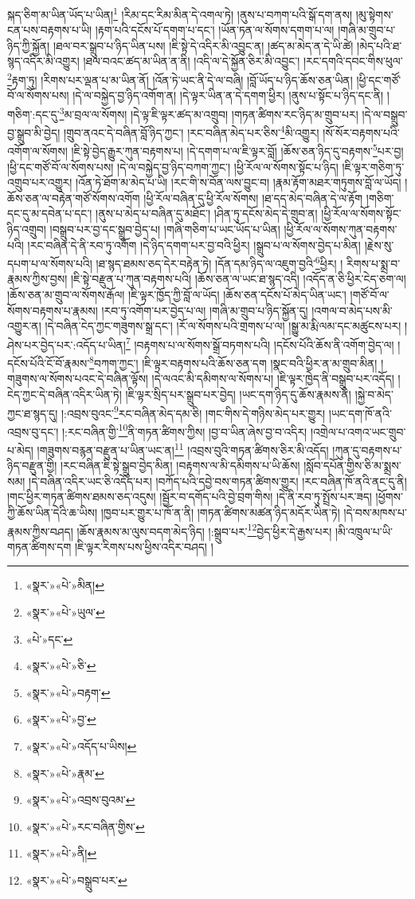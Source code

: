 སྐད་ཅིག་མ་ཡིན་ཡོད་པ་ཡིན།\footnote{«སྣར་»«པེ་»མིན།} །རིམ་དང་རིམ་མིན་དེ་འགལ་ཏེ། །ནུས་པ་བཀག་པའི་སྒོ་དག་ནས། །མུ་སྟེགས་ངན་པས་བརྟགས་པ་ཡི། །རྟག་པའི་དངོས་པོ་དགག་པ་དང་། །ཡོན་ཏན་ལ་སོགས་དགག་པ་ལ། །གཞི་མ་གྲུབ་པ་ཉིད་ཀྱི་སྐྱོན། །ཐལ་བར་སྒྲུབ་པ་ཉིད་ཡིན་པས། །ཇི་སྟེ་དེ་འདིར་མི་འབྱུང་ན། །ཚད་མ་མེད་ན་དེ་ཡི་ཚེ། །མེད་པའི་ཐ་སྙད་འདིར་མི་འགྱུར། །ཐལ་བའང་ཚད་མ་ཡིན་ན་ནི། །འདི་ལ་དེ་སྐྱོན་ཅིར་མི་འབྱུང་། །རང་དགའི་དབང་གིས་ཕུལ་\footnote{«སྣར་»«པེ་»ཡུལ་}རྟག་ཏུ། །རིགས་པར་ལྡན་པ་མ་ཡིན་ནོ། །འོན་ཏེ་ཡང་ནི་དེ་ལ་བཞི། །བློ་ཡོད་པ་ཉིད་ཆོས་ཅན་ཡིན། །ཕྱི་དང་གཙོ་བོ་ལ་སོགས་པས། །དེ་ལ་བསྐྱེད་བྱ་ཉིད་འགོག་ན། །དེ་ལྟར་ཡིན་ན་དེ་དགག་ཕྱིར། །ནུས་པ་སྟོང་པ་ཉིད་དང་ནི། །གཅིག་:དང་དུ་\footnote{«པེ་»དང་}མ་བྲལ་ལ་སོགས། །དེ་ལྟ་ཇི་ལྟར་ཚད་མ་འགྲུབ། །གཏན་ཚིགས་རང་ཉིད་མ་གྲུབ་པར། །དེ་ལ་བསྒྲུབ་བྱ་སྒྲུབ་མི་བྱེད། །གྲུབ་ནའང་དེ་བཞིན་བློ་ཉིད་ཀྱང་། །རང་བཞིན་མེད་པར་ཅིས་\footnote{«སྣར་»«པེ་»ཅི་}མི་འགྱུར། །སོ་སོར་བརྟགས་པའི་འགོག་ལ་སོགས། །ཇི་སྟེ་བྱེད་རྒྱུར་ཀུན་བརྟགས་པ། །དེ་དགག་པ་ལ་ཇི་ལྟར་བློ། །ཆོས་ཅན་ཉིད་དུ་བརྟགས་\footnote{«སྣར་»«པེ་»བརྟག་}པར་བྱ། །ཕྱི་དང་གཙོ་བོ་ལ་སོགས་པས། །དེ་ལ་བསྐྱེད་བྱ་ཉིད་བཀག་ཀྱང་། །ཕྱི་རོལ་ལ་སོགས་སྟོང་པ་ཉིད། །ཇི་ལྟར་གཅིག་ཏུ་འགྲུབ་པར་འགྱུར། །འོན་ཏེ་ཐོག་མ་མེད་པ་ཡི། །རང་གི་ས་བོན་ལས་བྱུང་བ། །རྣམ་རྟོག་མཐར་གཏུགས་བློ་ལ་ཡོད། །ཆོས་ཅན་ལ་བརྟེན་གཙོ་སོགས་འགོག །ཕྱི་རོལ་བཞིན་དུ་ཕྱི་རོལ་སོགས། །ཐ་དད་མེད་བཞིན་དེ་ལ་རྟོག །གཅིག་དང་དུ་མ་དབེན་པ་དང་། །ནུས་པ་མེད་པ་བཞིན་དུ་མཐོང་། །ཤིན་ཏུ་དངོས་མེད་དེ་གྲུབ་ན། །ཕྱི་རོལ་ལ་སོགས་སྟོང་ཉིད་འགྲུབ། །བསྒྲུབ་པར་བྱ་དང་སྒྲུབ་བྱེད་པ། །གཞི་གཅིག་པ་ཡང་ཡོད་པ་ཡིན། །ཕྱི་རོལ་ལ་སོགས་ཀུན་བརྟགས་པའི། །རང་བཞིན་དེ་ནི་རབ་ཏུ་འགོག །དེ་ཉིད་དགག་པར་བྱ་བའི་ཕྱིར། །སྒྲུབ་པ་ལ་སོགས་བྱེད་པ་མིན། །རྗེས་སུ་དཔག་པ་ལ་སོགས་པའི། །ཐ་སྙད་ཐམས་ཅད་དེར་བརྟེན་ཏེ། །དོན་དམ་ཉིད་ལ་འཇུག་བྱའི་\footnote{«སྣར་»«པེ་»བྱ་}ཕྱིར། །
རིགས་པ་སྨྲ་བ་རྣམས་ཀྱིས་བྱས། །ཇི་སྟེ་བརྫུན་པ་ཀུན་བརྟགས་པའི། །ཆོས་ཅན་ལ་ཡང་ཐ་སྙད་འདི། །འདོད་ན་ཅི་ཕྱིར་ངེད་ཅག་ལ། །ཆོས་ཅན་མ་གྲུབ་ལ་སོགས་རྒོལ། །ཇི་ལྟར་ཁྱོད་ཀྱི་བློ་ལ་ཡོད། །ཆོས་ཅན་དངོས་པོ་མེད་ཡིན་ཡང་། །གཙོ་བོ་ལ་སོགས་བརྟགས་པ་རྣམས། །རབ་ཏུ་འགོག་པར་བྱེད་པ་ལ། །གཞི་མ་གྲུབ་པ་ཉིད་སྐྱོན་དུ། །འགལ་བ་མེད་པས་མི་འགྱུར་ན། །དེ་བཞིན་ངེད་ཀྱང་གཟུགས་སྒྲ་དང་། །རོ་ལ་སོགས་པའི་གྲགས་པ་ལ། །སྒྱུ་མ་རྨི་ལམ་དང་མཚུངས་པར། །ཤེས་པར་བྱེད་པར་:འདོད་པ་ཡིན།\footnote{«སྣར་»«པེ་»འདོད་པ་ཡིས།} །བརྟགས་པ་ལ་སོགས་སྒྲོ་བཏགས་པའི། །དངོས་པོའི་ཆོས་ནི་འགོག་བྱེད་ལ། །དངོས་པོའི་ངོ་བོ་རྣམས་\footnote{«སྣར་»«པེ་»རྣམ་}བཀག་ཀྱང་། །ཇི་ལྟར་བརྟགས་པའི་ཆོས་ཅན་དག །སྣང་བའི་ཕྱིར་ན་མ་གྲུབ་མིན། །གཟུགས་ལ་སོགས་པའང་དེ་བཞིན་ལྟོས། །དེ་ལའང་མི་དམིགས་ལ་སོགས་པ། །ཇི་ལྟར་ཁྱེད་ནི་བསྒྲུབ་པར་འདོད། །ངེད་ཀྱང་དེ་བཞིན་འདིར་ཡིན་ཏེ། །ཇི་ལྟར་སྲིད་པར་སྒྲུབ་པར་བྱེད། །ཡང་དག་ཉིད་དུ་ཆོས་རྣམས་ནི། །སྐྱེ་བ་མེད་ཀྱང་ཐ་སྙད་དུ། །:འབྲས་བུའང་\footnote{«སྣར་»«པེ་»འབྲས་བུའམ་}རང་བཞིན་མེད་དམ་ཅི། །གང་གིས་དེ་གཉིས་མེད་པར་གྱུར། །ཡང་དག་ཁོ་ནའི་འབྲས་བུ་དང་། །:རང་བཞིན་གྱི་\footnote{«སྣར་»«པེ་»རང་བཞིན་གྱིས་}ནི་གཏན་ཚིགས་ཀྱིས། །བྱ་བ་ཡིན་ཞེས་བྱ་བ་འདིར། །འགྲེལ་པ་འགའ་ཡང་གྲུབ་པ་མེད། །གཟུགས་བརྙན་བརྫུན་པ་ཡིན་ཡང་ན།\footnote{«སྣར་»«པེ་»ནི།} །འབྲས་བུའི་གཏན་ཚིགས་ཅིར་མི་འདོད། །ཀུན་དུ་བརྟགས་པ་ཉིད་བརྫུན་གྱི། །རང་བཞིན་ཇི་སྟེ་སྒྲུབ་བྱེད་མིན། །བརྟགས་ལ་མི་དམིགས་པ་ཡི་ཆོས། །སློབ་དཔོན་གྱིས་ཅི་མ་སྨྲས་སམ། །དེ་བཞིན་འདིར་ཡང་ཅི་འདོད་པར། །བཀོད་པའི་དབྱེ་བས་གཏན་ཚིགས་གྱུར། །རང་བཞིན་ཁོ་ནའི་ནང་དུ་ནི། །གང་ཕྱིར་གཏན་ཚིགས་ཐམས་ཅད་འདུས། །སྦྱོར་བ་དགོད་པའི་བྱེ་བྲག་གིས། །དེ་ནི་རབ་ཏུ་སྤྲོས་པར་ཟད། །ཕྱོགས་ཀྱི་ཆོས་ཡིན་དེའི་ཆ་ཡིས། །ཁྱབ་པར་གྱུར་པ་ཁོ་ན་ནི། །གཏན་ཚིགས་མཚན་ཉིད་མདོར་ཡིན་ཏེ། །དེ་བས་མཁས་པ་རྣམས་ཀྱིས་བཤད། །ཆོས་རྣམས་མ་ལུས་བདག་མེད་ཉིད། །:སྒྲུབ་པར་\footnote{«སྣར་»«པེ་»བསྒྲུབ་པར་}བྱེད་ཕྱིར་དེ་རྒྱས་པར། །མི་འཁྲུལ་པ་ཡི་གཏན་ཚིགས་དག །ཇི་ལྟར་རིགས་པས་ཕྱིས་འདིར་བཤད། །
